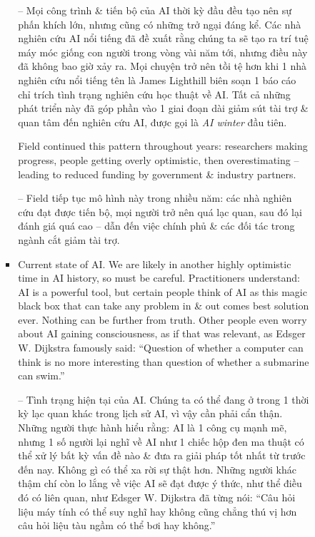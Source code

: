 \documentclass{article}
\begin{document}
\begin{itemize}
\begin{itemize}
\begin{itemize}
\begin{itemize}
                -- Mọi công trình \& tiến bộ của AI thời kỳ đầu đều tạo nên sự phấn khích lớn, nhưng cũng có những trở ngại đáng kể. Các nhà nghiên cứu AI nổi tiếng đã đề xuất rằng chúng ta sẽ tạo ra trí tuệ máy móc giống con người trong vòng vài năm tới, nhưng điều này đã không bao giờ xảy ra. Mọi chuyện trở nên tồi tệ hơn khi 1 nhà nghiên cứu nổi tiếng tên là {\sc James Lighthill} biên soạn 1 báo cáo chỉ trích tình trạng nghiên cứu học thuật về AI. Tất cả những phát triển này đã góp phần vào 1 giai đoạn dài giảm sút tài trợ \& quan tâm đến nghiên cứu AI, được gọi là {\it AI winter} đầu tiên.

                Field continued this pattern throughout years: researchers making progress, people getting overly optimistic, then overestimating -- leading to reduced funding by government \& industry partners.

                -- Field tiếp tục mô hình này trong nhiều năm: các nhà nghiên cứu đạt được tiến bộ, mọi người trở nên quá lạc quan, sau đó lại đánh giá quá cao -- dẫn đến việc chính phủ \& các đối tác trong ngành cắt giảm tài trợ.
                \item {\sf Current state of AI.} We are likely in another highly optimistic time in AI history, so must be careful. Practitioners understand: AI is a powerful tool, but certain people think of AI as this magic black box that can take any problem in \& out comes best solution ever. Nothing can be further from truth. Other people even worry about AI gaining consciousness, as if that was relevant, as {\sc Edsger W. Dijkstra} famously said: ``Question of whether a computer can think is no more interesting than question of whether a submarine can swim.''

                -- {\sf Tình trạng hiện tại của AI.} Chúng ta có thể đang ở trong 1 thời kỳ lạc quan khác trong lịch sử AI, vì vậy cần phải cẩn thận. Những người thực hành hiểu rằng: AI là 1 công cụ mạnh mẽ, nhưng 1 số người lại nghĩ về AI như 1 chiếc hộp đen ma thuật có thể xử lý bất kỳ vấn đề nào \& đưa ra giải pháp tốt nhất từ trước đến nay. Không gì có thể xa rời sự thật hơn. Những người khác thậm chí còn lo lắng về việc AI sẽ đạt được ý thức, như thể điều đó có liên quan, như {\sc Edsger W. Dijkstra} đã từng nói: ``Câu hỏi liệu máy tính có thể suy nghĩ hay không cũng chẳng thú vị hơn câu hỏi liệu tàu ngầm có thể bơi hay không.''


\end{itemize}
\end{itemize}
\end{itemize}
\end{itemize}
\end{document}
